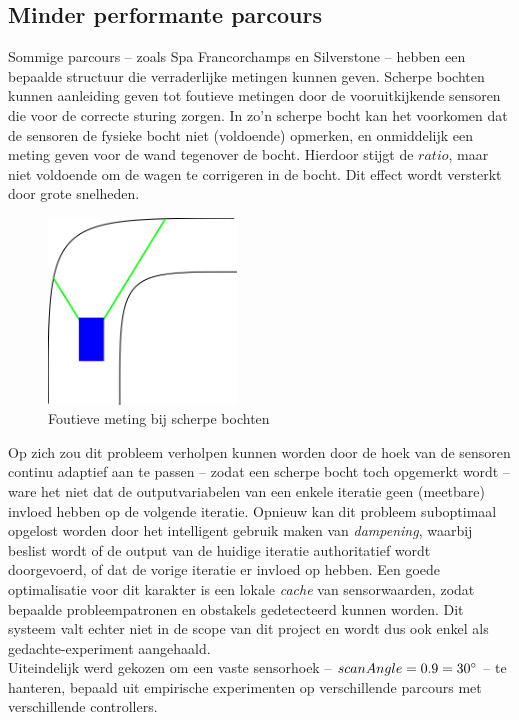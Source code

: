 \documentclass[10pt,a4paper]{article}
\begin{document}
		\subsection{Minder performante parcours}
			Sommige parcours -- zoals Spa Francorchamps en Silverstone -- hebben een bepaalde structuur die verraderlijke metingen kunnen geven. Scherpe bochten kunnen aanleiding geven tot foutieve metingen door de vooruitkijkende sensoren die voor de correcte sturing zorgen. In zo'n scherpe bocht kan het voorkomen dat de sensoren de fysieke bocht niet (voldoende) opmerken, en onmiddelijk een meting geven voor de wand tegenover de bocht. Hierdoor stijgt de $ratio$, maar niet voldoende om de wagen te corrigeren in de bocht. Dit effect wordt versterkt door grote snelheden.

			\begin{figure}[h]
				\centering
				\includegraphics[width=5cm]{sensors-corner.png}
				\caption{Foutieve meting bij scherpe bochten}
				\label{fig:sensors-corner}
			\end{figure}

			Op zich zou dit probleem verholpen kunnen worden door de hoek van de sensoren continu adaptief aan te passen -- zodat een scherpe bocht toch opgemerkt wordt -- ware het niet dat de outputvariabelen van een enkele iteratie geen (meetbare) invloed hebben op de volgende iteratie. Opnieuw kan dit probleem suboptimaal opgelost worden door het intelligent gebruik maken van \textit{dampening}, waarbij beslist wordt of de output van de huidige iteratie authoritatief wordt doorgevoerd, of dat de vorige iteratie er invloed op hebben. Een goede optimalisatie voor dit karakter is een lokale \textit{cache} van sensorwaarden, zodat bepaalde probleempatronen en obstakels gedetecteerd kunnen worden. Dit systeem valt echter niet in de scope van dit project en wordt dus ook enkel als gedachte-experiment aangehaald.\\

			Uiteindelijk werd gekozen om een vaste sensorhoek -- $scanAngle = 0.9 = 30 \degree$ -- te hanteren, bepaald uit empirische experimenten op verschillende parcours met verschillende controllers.
\end{document}
